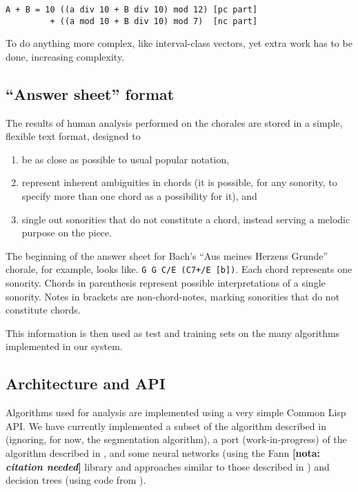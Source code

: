 \documentclass{article}
\newcommand{\nota}[1]{
  \textbf{[nota: \textit{#1}]}
}
\begin{document}
\begin{verbatim}
A + B = 10 ((a div 10 + B div 10) mod 12) [pc part]
         + ((a mod 10 + B div 10) mod 7)  [nc part]
\end{verbatim}

To do anything more complex, like interval-class vectors, yet extra
work has to be done, increasing complexity.

\subsection{``Answer sheet'' format}
\label{sec:formato-dos-acordes}

The results of human analysis performed on the chorales are stored in
a simple, flexible text format, designed to

\begin{enumerate}
\item be as close as possible to
usual popular notation,
\item represent inherent ambiguities in chords (it is possible, for
  any sonority, to specify more than one chord as a possibility for
  it), and
\item single out sonorities that do not constitute a chord, instead
  serving a melodic purpose on the piece.
\end{enumerate}

The beginning of the answer sheet for Bach's ``Aus meines Herzens
Grunde'' chorale, for example, looks like. \texttt{G G C/E (C7+/E
  [b])}. Each chord represents one sonority. Chords in parenthesis
represent possible interpretations of a single sonority. Notes in
brackets are non-chord-notes, marking sonorities that do not
constitute chords.

This information is then used as test and training sets on the many
algorithms implemented in our system.

\subsection{Architecture and API}
\label{sec:architecture-and-api}

Algorithms used for analysis are implemented using a very simple
Common Lisp API. We have currently implemented a subset of the
algorithm described in \cite{pardo02:algorithms} (ignoring, for now,
the segmentation algorithm), a port (work-in-progress) of the
algorithm described in \cite{temperley99:modeling}, and some neural
networks (using the Fann \nota{citation needed} library and approaches
similar to those described in
\cite{tsui02:_harmon_analy_using_neural_networ}) and decision trees
(using code from \cite{Mitchell:1997:ML}).
\end{document}
